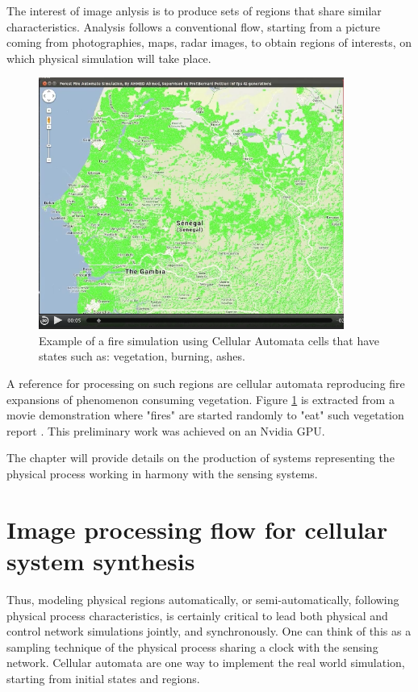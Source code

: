 The interest of image anlysis is to  produce sets of  regions that share similar characteristics.
Analysis follows a conventional flow, starting from a picture coming  from
photographies, maps, radar images, to obtain regions of interests, on which physical simulation  will
take place.

\begin{figure}[hbtp]
\begin{center} 
\includegraphics[width=10cm]{AhmedFire.png}
\caption{Example of a fire simulation  using Cellular Automata  cells that have  states such as:
vegetation, burning, ashes.}
\label{fig:AhmedFire}
\end{center}
\end{figure}

A reference for processing on such regions are cellular automata
reproducing fire expansions of phenomenon consuming  vegetation.
Figure \ref{fig:AhmedFire} is extracted from a
movie demonstration where "fires" are started randomly to "eat" such vegetation report \cite{AhmedFire}. This
preliminary work was achieved on an Nvidia GPU.

The chapter will provide details on the production of   systems representing the physical
process working in harmony with the sensing systems.

\section{Image processing  flow for cellular system synthesis}

Thus,   modeling  physical regions automatically, or semi-automatically, following physical process 
characteristics, is certainly critical to lead both physical and control network  simulations jointly,
and synchronously. One can think of this as a sampling technique of the physical process sharing
a clock with the sensing network. Cellular automata are one way to implement the real world simulation,
starting from initial states and regions.


